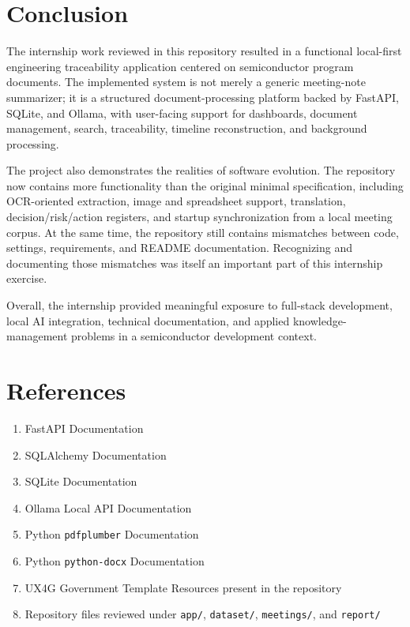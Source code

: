 \documentclass[12pt, a4paper]{article}
\begin{document}
\section{Conclusion}
The internship work reviewed in this repository resulted in a functional local-first engineering traceability application centered on semiconductor program documents. The implemented system is not merely a generic meeting-note summarizer; it is a structured document-processing platform backed by FastAPI, SQLite, and Ollama, with user-facing support for dashboards, document management, search, traceability, timeline reconstruction, and background processing.

The project also demonstrates the realities of software evolution. The repository now contains more functionality than the original minimal specification, including OCR-oriented extraction, image and spreadsheet support, translation, decision/risk/action registers, and startup synchronization from a local meeting corpus. At the same time, the repository still contains mismatches between code, settings, requirements, and README documentation. Recognizing and documenting those mismatches was itself an important part of this internship exercise.

Overall, the internship provided meaningful exposure to full-stack development, local AI integration, technical documentation, and applied knowledge-management problems in a semiconductor development context.

\section*{References}
\begin{enumerate}
\item FastAPI Documentation
\item SQLAlchemy Documentation
\item SQLite Documentation
\item Ollama Local API Documentation
\item Python \texttt{pdfplumber} Documentation
\item Python \texttt{python-docx} Documentation
\item UX4G Government Template Resources present in the repository
\item Repository files reviewed under \texttt{app/}, \texttt{dataset/}, \texttt{meetings/}, and \texttt{report/}
\end{enumerate}
\end{document}

